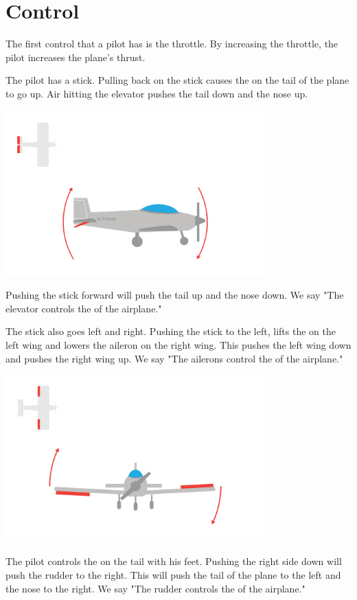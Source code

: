 \section{Control}

The first control that a pilot has is the throttle.   By increasing the throttle,  the pilot increases the plane's thrust.

The pilot has a stick.  Pulling back on the stick causes the  on the tail of the plane to go up.  Air hitting the elevator pushes the tail down and the nose up. 

\includegraphics[width=0.75\textwidth]{elevator.png}


Pushing the stick forward will push the tail up and the nose down.  We say "The elevator controls the  of the airplane."

The stick also goes left and right.   Pushing the stick to the left,  lifts the  on the left wing and lowers the aileron on the right wing.  This pushes the left wing down and 
pushes the right wing up.  We say "The ailerons control the   of the airplane."

\includegraphics[width=0.75\textwidth]{ailerons.png}


The pilot controls the  on the tail with his feet.   Pushing the right side down will push the rudder to the right.  This will push the tail of the plane to the left and the 
nose to the right.  We say "The rudder controls the  of the airplane."

